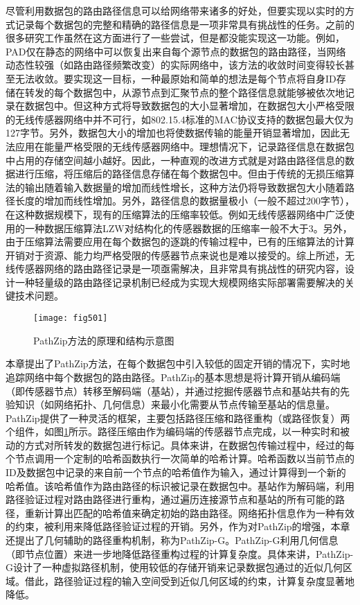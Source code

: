 尽管利用数据包的路由路径信息可以给网络带来诸多的好处，但要实现以实时的方式记录每个数据包的完整和精确的路径信息是一项非常具有挑战性的任务。之前的很多研究工作虽然在这方面进行了一些尝试，但是都没能实现这一功能。例如，PAD仅在静态的网络中可以恢复出来自每个源节点的数据包的路由路径，当网络动态性较强（如路由路径频繁改变）的实际网络中，该方法的收敛时间变得较长甚至无法收敛。要实现这一目标，一种最原始和简单的想法是每个节点将自身ID存储在转发的每个数据包中，从源节点到汇聚节点的整个路径信息就能够被依次地记录在数据包中。但这种方式将导致数据包的大小显著增加，在数据包大小严格受限的无线传感器网络中并不可行，如802.15.4标准的MAC协议支持的数据包最大仅为127字节。另外，数据包大小的增加也将使数据传输的能量开销显著增加，因此无法应用在能量严格受限的无线传感器网络中。理想情况下，记录路径信息在数据包中占用的存储空间越小越好。因此，一种直观的改进方式就是对路由路径信息的数据进行压缩，将压缩后的路径信息存储在每个数据包中。但由于传统的无损压缩算法的输出随着输入数据量的增加而线性增长，这种方法仍将导致数据包大小随着路径长度的增加而线性增加。另外，路径信息的数据量极小（一般不超过200字节），在这种数据规模下，现有的压缩算法的压缩率较低。例如无线传感器网络中广泛使用的一种数据压缩算法LZW对结构化的传感器数据的压缩率一般不大于3。另外，由于压缩算法需要应用在每个数据包的逐跳的传输过程中，已有的压缩算法的计算开销对于资源、能力均严格受限的传感器节点来说也是难以接受的。综上所述，无线传感器网络的路由路径记录是一项亟需解决，且非常具有挑战性的研究内容，设计一种轻量级的路由路径记录机制已经成为实现大规模网络实际部署需要解决的关键技术问题。
\begin{figure}[t]
\centering
\texttt{[image: fig501]}
\caption{PathZip方法的原理和结构示意图}
\label{fig:501}
\end{figure}

本章提出了PathZip方法，在每个数据包中引入较低的固定开销的情况下，实时地追踪网络中每个数据包的路由路径。PathZip的基本思想是将计算开销从编码端（即传感器节点）转移至解码端（基站），并通过挖掘传感器节点和基站共有的先验知识（如网络拓扑、几何信息）来最小化需要从节点传输至基站的信息量。PathZip提供了一种灵活的框架，主要包括路径压缩和路径重构（或路径恢复）两个组件，如图\ref{fig:501}所示。路径压缩由作为编码端的传感器节点完成，以一种实时和被动的方式对所转发的数据包进行标记。具体来讲，在数据包传输过程中，经过的每个节点调用一个定制的哈希函数执行一次简单的哈希计算。哈希函数以当前节点的ID及数据包中记录的来自前一个节点的哈希值作为输入，通过计算得到一个新的哈希值。该哈希值作为路由路径的标识被记录在数据包中。基站作为解码端，利用路径验证过程对路由路径进行重构，通过遍历连接源节点和基站的所有可能的路径，重新计算出匹配的哈希值来确定初始的路由路径。网络拓扑信息作为一种有效的约束，被利用来降低路径验证过程的开销。另外，作为对PathZip的增强，本章还提出了几何辅助的路径重构机制，称为PathZip-G。PathZip-G利用几何信息（即节点位置）来进一步地降低路径重构过程的计算复杂度。具体来讲，PathZip-G设计了一种虚拟路径机制，使用较低的存储开销来记录数据包通过的近似几何区域。借此，路径验证过程的输入空间受到近似几何区域的约束，计算复杂度显著地降低。

